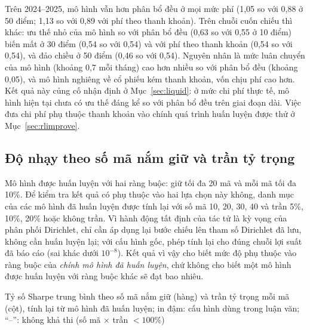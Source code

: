 Trên 2024--2025, mô hình vẫn hơn phân bổ đều ở mọi mức phí (1,05 so với 0,88 ở 50 điểm; 1,13 so với 0,89 với phí theo thanh khoản). Trên chuỗi cuốn chiếu thì khác: ưu thế nhỏ của mô hình so với phân bổ đều (0,63 so với 0,55 ở 10 điểm) biến mất ở 30 điểm (0,54 so với 0,54) và với phí theo thanh khoản (0,54 so với 0,54), và đảo chiều ở 50 điểm (0,46 so với 0,54). Nguyên nhân là mức luân chuyển của mô hình (khoảng 0,7 mỗi tháng) cao hơn nhiều so với phân bổ đều (khoảng 0,05), và mô hình nghiêng về cổ phiếu kém thanh khoản, vốn chịu phí cao hơn. Kết quả này củng cố nhận định ở Mục~\ref{sec:liquid}: ở mức chi phí thực tế, mô hình hiện tại chưa có ưu thế đáng kể so với phân bổ đều trên giai đoạn dài. Việc đưa chi phí phụ thuộc thanh khoản vào chính quá trình huấn luyện được thử ở Mục~\ref{sec:rlimprove}.

\subsection{Độ nhạy theo số mã nắm giữ và trần tỷ trọng}

Mô hình được huấn luyện với hai ràng buộc: giữ tối đa 20 mã và mỗi mã tối đa 10\%. Để kiểm tra kết quả có phụ thuộc vào hai lựa chọn này không, danh mục của các mô hình đã huấn luyện được tính lại với số mã 10, 20, 30, 40 và trần 5\%, 10\%, 20\% hoặc không trần. Vì hành động tất định của tác tử là kỳ vọng của phân phối Dirichlet, chỉ cần áp dụng lại bước chiếu lên tham số Dirichlet đã lưu, không cần huấn luyện lại; với cấu hình gốc, phép tính lại cho đúng chuỗi lợi suất đã báo cáo (sai khác dưới $10^{-8}$). Kết quả vì vậy cho biết mức độ phụ thuộc vào ràng buộc của \emph{chính mô hình đã huấn luyện}, chứ không cho biết một mô hình được huấn luyện với ràng buộc khác sẽ đạt bao nhiêu.

\begin{table}[ht]
\centering\footnotesize
\setlength{\tabcolsep}{3pt}
\caption{Tỷ số Sharpe trung bình theo số mã nắm giữ (hàng) và trần tỷ trọng mỗi mã (cột), tính lại từ mô hình đã huấn luyện; in đậm: cấu hình dùng trong luận văn; ``--'': không khả thi (số mã $\times$ trần $< 100\%$)}
\label{tab:sensweights}
\begin{adjustbox}{max width=\textwidth}\end{adjustbox}
\end{table}

